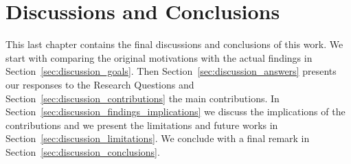 \chapter{\statusgreen Discussions and Conclusions}
\label{chap:discussion}


This last chapter contains the final discussions and conclusions of this work.
We start with comparing the original motivations with the actual findings in Section~\ref{sec:discussion_goals}.
Then Section~\ref{sec:discussion_answers} presents our responses to the Research Questions and Section~\ref{sec:discussion_contributions} the main contributions.
In Section~\ref{sec:discussion_findings_implications} we discuss the implications of the contributions and we present the limitations and future works in Section~\ref{sec:discussion_limitations}.
We conclude with a final remark in Section~\ref{sec:discussion_conclusions}.














